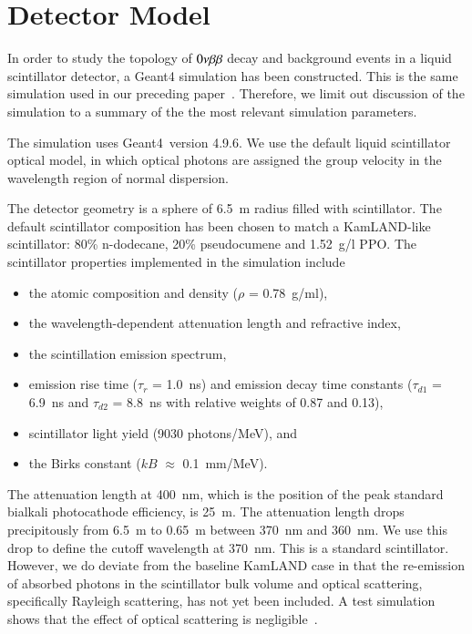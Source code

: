 \section{Detector Model}
\label{sec:detector_description}

In order to study the topology of $0\nu\beta\beta$ decay and background events in a liquid scintillator detector, a Geant4\cite{geant4one,geant4two} simulation has been constructed. This is the same simulation used in our preceding paper~\cite{Aberle2014}. Therefore, we limit out discussion of the simulation to a summary of the the most relevant simulation parameters.

The simulation uses Geant4~version 4.9.6.  We use the default liquid scintillator optical model, in which optical photons are assigned the group velocity in the wavelength region of normal dispersion.

The detector geometry is a sphere of 6.5~m radius filled with
scintillator. The default scintillator composition has been chosen to match a KamLAND-like
scintillator\cite{kamland2003}: 80\% n-dodecane, 20\% pseudocumene and 1.52~g/l PPO. The
scintillator properties implemented in the simulation include 
\begin{itemize}
\item the atomic composition and density ($\rho$ = 0.78~g/ml), 
\item the wavelength-dependent attenuation length\cite{tajimaMaster} and refractive index\cite{OlegThesis}, 
\item the scintillation emission spectrum\cite{tajimaMaster}, 
\item emission rise time ($\tau_r$ = 1.0~ns) and emission decay time constants ($\tau_{d1}$ = 6.9~ns and $\tau_{d2}$ = 8.8~ns with relative weights of 0.87 and 0.13)\cite{tajimaThesis}, 
\item scintillator light yield (9030 photons/MeV), and 
\item the Birks constant ($kB$ $\approx$ 0.1~mm/MeV)\cite{ChrisThesis}.  
\end{itemize}
The attenuation length at 400~nm, which is the position of the peak standard bialkali photocathode efficiency, is 25~m. The attenuation length drops precipitously from 6.5~m to 0.65~m between 370~nm and 360~nm. We use this drop to define the cutoff wavelength at 370~nm. This is a standard scintillator. However, we do deviate from the baseline KamLAND case in that the re-emission of absorbed photons in the scintillator bulk volume and optical scattering, specifically Rayleigh scattering, has not yet been included. A test simulation shows that the effect of optical scattering is negligible~\cite{Aberle2014}.

